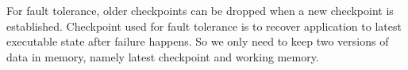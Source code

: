 \documentclass[conference]{IEEEtran}
\begin{document}
\begin{enumerate*}
    \item For fault tolerance, older checkpoints can be dropped when a new checkpoint is established\cite{rajachandrasekar_1_2013}.
		Checkpoint used for fault tolerance is to recover application to latest executable state after failure happens.
        So we only need to keep two versions of data in memory, namely latest checkpoint and working memory.
\end{enumerate*}
\end{document}
